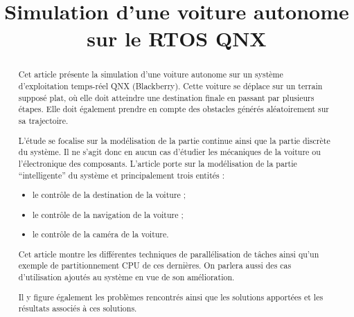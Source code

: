 \documentclass[conference]{IEEEtran}
\begin{document}
\title{Simulation d'une voiture autonome sur le RTOS QNX}

\author{
\and
{}
}

\maketitle

\begin{abstract}

Cet article présente la simulation d'une voiture autonome sur un système d'exploitation
temps-réel QNX (Blackberry). Cette voiture se déplace sur un terrain supposé plat, où elle
doit atteindre une destination finale en passant par plusieurs étapes. Elle doit également
prendre en compte des obstacles générés aléatoirement sur sa trajectoire.
 
 L'étude se focalise sur la modélisation de la partie continue ainsi que la partie
 discrète du système. Il ne s'agit donc en aucun cas d'étudier les mécaniques de la
 voiture ou l'électronique des composants. L'article porte sur la modélisation de la
 partie \enquote{intelligente} du système et principalement trois entités :
 \begin{itemize}
     \item le contrôle de la destination de la voiture ;
     \item le contrôle de la navigation de la voiture ;
     \item le contrôle de la caméra de la voiture.
 \end{itemize}
 
 Cet article montre les différentes techniques de parallélisation de tâches ainsi qu'un
 exemple de partitionnement CPU de ces dernières. On parlera aussi des cas d'utilisation
 ajoutés au système en vue de son amélioration.
 
 Il y figure également les problèmes rencontrés ainsi que les solutions apportées et les
 résultats associés à ces solutions.
 
\end{abstract}
\end{document}
